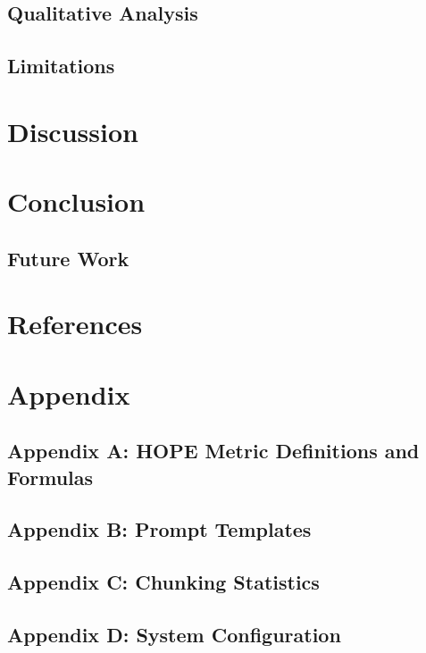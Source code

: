 \documentclass[
  english,
  12pt,
]{report}
\begin{document}
\section{Qualitative Analysis}\label{qualitative-analysis}

\section{Limitations}\label{limitations}

\newpage

\chapter{Discussion}\label{discussion}

\newpage

\chapter{Conclusion}\label{conclusion}

\section{Future Work}\label{future-work}

\newpage

\chapter*{References}\label{references}

\printbibliography[heading=none]

\newpage

\chapter*{Appendix}\label{appendix}

\section*{Appendix A: HOPE Metric Definitions and
Formulas}\label{appendix-a-hope-metric-definitions-and-formulas}

\section*{Appendix B: Prompt
Templates}\label{appendix-b-prompt-templates}

\section*{Appendix C: Chunking
Statistics}\label{appendix-c-chunking-statistics}

\section*{Appendix D: System
Configuration}\label{appendix-d-system-configuration}
\end{document}
